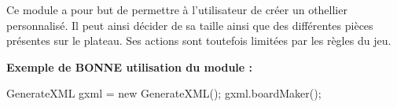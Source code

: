 Ce module a pour but de permettre à l'utilisateur de créer un othellier personnalisé. Il peut ainsi décider de sa taille ainsi que des différentes pièces présentes sur le plateau. Ses actions sont toutefois limitées par les règles du jeu.

{\bfseries Exemple de B\-O\-N\-N\-E utilisation du module \-: } \begin{DoxyVerb}  GenerateXML gxml = new GenerateXML();
  gxml.boardMaker();\end{DoxyVerb}
 